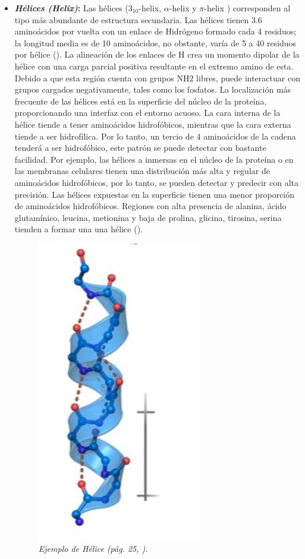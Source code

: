 \begin{itemize}
	\item \textbf{\textit{Hélices (Helix)}:} Las hélices ($3_{10}$-helix, $\alpha$-helix y $\pi$-helix ) corresponden al tipo más abundante de estructura secundaria. Las hélices tienen 3.6 aminoácidos por vuelta con un enlace de Hidrógeno formado cada 4 residuos; la longitud media es de 10 aminoácidos, no obstante, varía de 5 a 40 residuos por hélice (\citealp{molecular:book}). La alineación de los enlaces de H crea un momento dipolar de la hélice con una carga parcial positiva resultante en el extremo amino de esta. Debido a que esta región cuenta con grupos NH2 libres, puede interactuar con grupos cargados negativamente, tales como los fosfatos. La localización más frecuente de las hélices está en la superficie del núcleo de la proteína, proporcionando una interfaz con el entorno acuoso. La cara interna de la hélice tiende a tener aminoácidos hidrofóbicos, mientras que la cara externa tiende a ser hidrofílica. Por lo tanto, un tercio de 4 aminoácidos de la cadena tenderá a ser hidrofóbico, este patrón se puede detectar con bastante facilidad. Por ejemplo, las hélices a inmersas en el núcleo de la proteína o en las membranas celulares tienen una distribución más alta y regular de aminoácidos hidrofóbicos, por lo tanto, se pueden detectar y predecir con alta precisión. Las hélices expuestas en la superficie tienen una menor proporción de aminoácidos hidrofóbicos. Regiones con alta presencia de alanina, ácido glutamínico, leucina, metionina y baja de prolina, glicina, tirosina, serina tienden a formar una una hélice (\citealp{lehninger}).
	
	\begin{figure}[H]
		\centering
		\includegraphics[scale=.4]{images/helix.png}
		\caption{\em Ejemplo de Hélice (pág. 25, \citealp{bioinfopt}).}
		\label{fig:helix}
	\end{figure}


\end{itemize}
